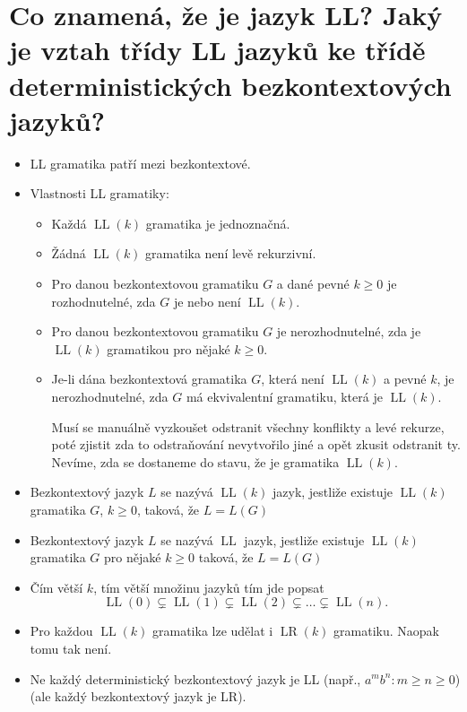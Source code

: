 \documentclass{article}
\begin{document}
\section{Co znamená, že je jazyk LL? Jaký je vztah třídy LL jazyků ke třídě deterministických bezkontextových jazyků?}
\begin{itemize}
\item LL gramatika patří mezi bezkontextové.
\item Vlastnosti LL gramatiky:
\begin{itemize}
    \item Každá $\operatorname{LL}(k)$ gramatika je jednoznačná.
    \item Žádná $\operatorname{LL}(k)$ gramatika není levě rekurzivní.
    \item Pro danou bezkontextovou gramatiku $G$ a dané pevné $k \geq 0$ je rozhodnutelné, zda $G$ je nebo není $\operatorname{LL}(k)$.
    \item Pro danou bezkontextovou gramatiku $G$ je nerozhodnutelné, zda je $\operatorname{LL}(k)$ gramatikou pro nějaké $k\geq0$.
    \item Je-li dána bezkontextová gramatika $G$, která není $\operatorname{LL}(k)$ a pevné $k$, je nerozhodnutelné, zda $G$ má ekvivalentní gramatiku, která je $\operatorname{LL}(k)$.
  
    Musí se manuálně vyzkoušet odstranit všechny konflikty a levé rekurze, poté zjistit zda to odstraňování nevytvořilo jiné a opět zkusit odstranit ty.
    Nevíme, zda se dostaneme do stavu, že je gramatika $\operatorname{LL}(k)$.
\end{itemize}
\item Bezkontextový jazyk $L$ se nazývá \textcolor{myPink}{$\operatorname{LL}(k)$} jazyk, jestliže existuje $\operatorname{LL}(k)$ gramatika $G$, $k \geq 0$, taková, že $L=L(G)$
\item Bezkontextový jazyk $L$ se nazývá \textcolor{myPink}{$\operatorname{LL}$} jazyk, jestliže existuje $\operatorname{LL}(k)$ gramatika $G$ pro nějaké $k \geq 0$ taková, že $L=L(G)$
\item Čím větší $k$, tím větší množinu jazyků tím jde popsat $$\operatorname{LL}(0) \subsetneq \operatorname{LL}(1) \subsetneq \operatorname{LL}(2) \subsetneq \dots \subsetneq \operatorname{LL}(n).$$
\item Pro každou $\operatorname{LL}(k)$ gramatika lze udělat i $\operatorname{LR}(k)$ gramatiku. Naopak tomu tak není.
\item Ne každý deterministický bezkontextový jazyk je LL (např., $a^m b^n : m \geq n \geq 0 $) (ale každý bezkontextový jazyk je LR).
\end{itemize}
\end{document}
